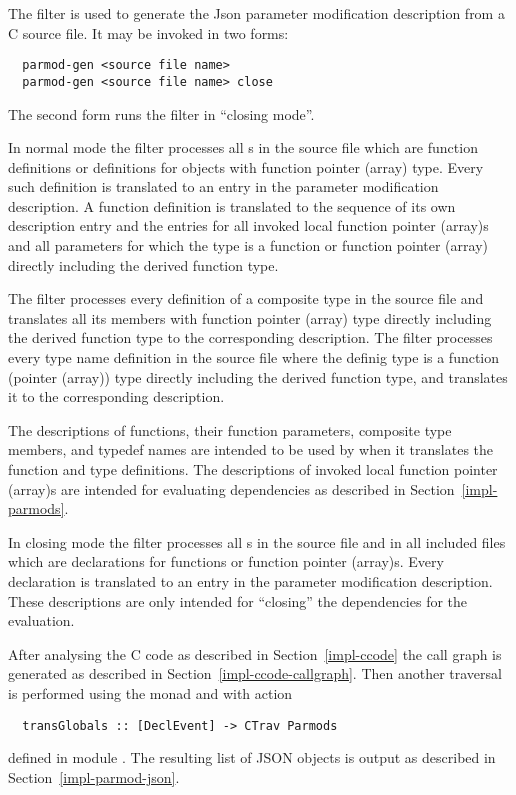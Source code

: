 The filter  is used to generate the Json parameter modification description from a C source file.
It may be invoked in two forms:
\begin{verbatim}
  parmod-gen <source file name>
  parmod-gen <source file name> close
\end{verbatim}
The second form runs the filter in ``closing mode''.

In normal mode the filter processes all s in the source file which are function
definitions or definitions for objects with function pointer (array) type. Every such definition is translated to an
entry in the parameter modification description. A function definition is translated to the sequence of its
own description entry and the entries for all invoked local function pointer (array)s and all parameters for which
the type is a function or function pointer (array) directly including the derived function type.

The filter processes every definition of a composite type in the source file and translates all
its members with function pointer (array) type directly including the derived function type to the corresponding
description. The filter processes every type name definition in the source file where the definig type
is a function (pointer (array)) type directly including the derived function type, and translates it to
the corresponding description.

The descriptions of functions, their function parameters, composite type members, and typedef names are 
intended to be used by 
when it translates the function and type definitions. The descriptions of invoked local function pointer (array)s
are intended for evaluating dependencies as described in Section~\ref{impl-parmods}.

In closing mode the filter processes all s in the source file and in all included files which
are declarations for functions or function pointer (array)s. Every declaration is translated to an entry in the parameter
modification description. These descriptions are only intended for ``closing'' the dependencies for the evaluation.

After analysing the C code as described in Section~\ref{impl-ccode} the call graph is generated as described
in Section~\ref{impl-ccode-callgraph}. Then another traversal is performed using the  monad and
 with action
\begin{verbatim}
  transGlobals :: [DeclEvent] -> CTrav Parmods
\end{verbatim}
defined in module . The resulting list of JSON objects is output as described 
in Section~\ref{impl-parmod-json}.

